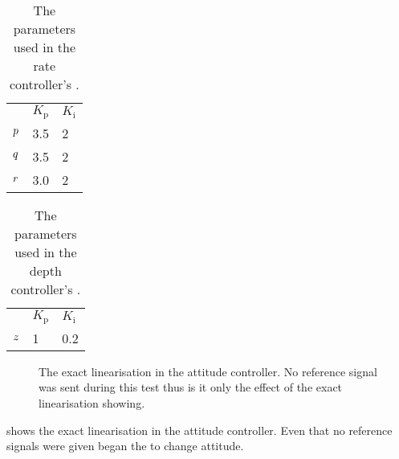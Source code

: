 \begin{table}[tbp]
  \centering
  \caption{\label{tab:parametersRate}%
    The parameters used in the rate controller's \abbrPI.}
  \begin{tabular}{l l l}
    \toprule%
       & \textbf{$K_\text{p}$} & \textbf{$K_\text{i}$}\\
    \otoprule%
    $p$  & 3.5 & 2 \\
    $q$ & 3.5 & 2 \\
    $r$   & 3.0 & 2 \\
    \bottomrule%
  \end{tabular}
\end{table}

\begin{table}[tbp]
  \centering
  \caption{\label{tab:parametersDepth}%
    The parameters used in the depth controller's \abbrPI.}
  \begin{tabular}{l l l}
    \toprule%
       & \textbf{$K_\text{p}$} & \textbf{$K_\text{i}$}\\
    \otoprule%
    $z$  & 1 & 0.2 \\
    \bottomrule%
  \end{tabular}
\end{table}

\begin{figure}
\centering
  \qquad
  \qquad
  \caption{\label{fig:ExactLinAttitude}%
  The exact linearisation in the attitude controller. No reference signal was sent during this test thus is it only the effect of the exact linearisation showing.}
\end{figure}

 shows the exact linearisation in the attitude controller. Even that no reference signals were given began the \abbrROV to change attitude.  

